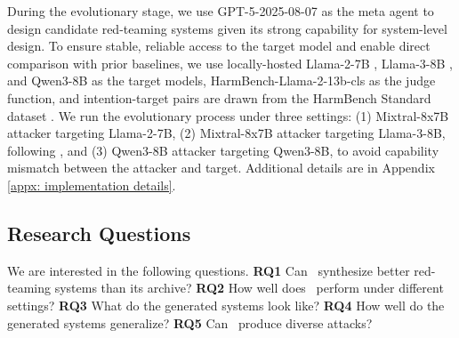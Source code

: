 During the evolutionary stage, we use GPT-5-2025-08-07 as the meta agent to design candidate red-teaming systems given its strong capability for system-level design. To ensure stable, reliable access to the target model and enable direct comparison with prior baselines, we use locally-hosted Llama-2-7B \citep{touvron2023llama2openfoundation}, Llama-3-8B \citep{llama3modelcard}, and Qwen3-8B \citep{qwen3technicalreport} as the target models, HarmBench-Llama-2-13b-cls as the judge function, and intention-target pairs are drawn from the HarmBench Standard dataset \citep{mazeika2024harmbench}. We run the evolutionary process under three settings: (1) Mixtral-8x7B \citep{jiang2024mixtral} attacker targeting Llama-2-7B, (2) Mixtral-8x7B attacker targeting Llama-3-8B, following \cite{sabbaghi2025adversarial}, and (3) Qwen3-8B attacker targeting Qwen3-8B, to avoid capability mismatch between the attacker and target. Additional details are in Appendix \ref{appx: implementation details}.
\vspace{-0.2cm}
\subsection{Research Questions}
\label{expr:research questions}

We are interested in the following questions. \textbf{RQ1} Can \method~synthesize better red-teaming systems than its archive? \textbf{RQ2} How well does \method~perform under different settings? \textbf{RQ3} What do the generated systems look like? \textbf{RQ4} How well do the generated systems generalize? \textbf{RQ5} Can \method~produce diverse attacks?


